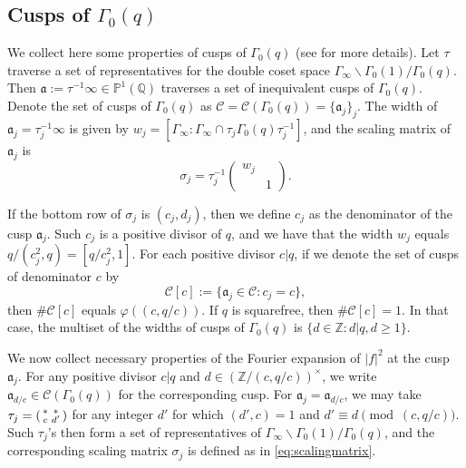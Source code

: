 \documentclass[12pt,reqno]{amsart}
\theoremstyle{remark}
\newcommand{\bs}{\backslash}
\numberwithin{equation}{section}
\begin{document}
	
	\subsection{Cusps of \texorpdfstring{$\Gamma_0(q)$}{G} }\label{subsec:cusps}
	We collect here some properties of cusps of $\Gamma_0(q)$ (see \cite[Section 3.4]{NPS} for more details). Let $\tau$ traverse a set of representatives for the double coset space $\Gamma_{\infty}\bs\Gamma_0(1)/\Gamma_0(q)$. Then $\mathfrak{a}:= \tau^{-1} \infty \in \mathbb{P}^1(\mathbb{Q})$ traverses a set of inequivalent cusps of $\Gamma_0(q)$. Denote the set of cusps of $\Gamma_0(q)$ as $\mathcal{C} = \mathcal{C}(\Gamma_0(q))=\{\mathfrak{a}_j\}_j$. The width of $\mathfrak{a}_j = \tau_j^{-1} \infty$ is given by $w_j = [\Gamma_\infty: \Gamma_\infty \cap \tau_j\Gamma_0(q)\tau_j^{-1}]$, and the scaling matrix of $\mathfrak{a}_j$ is 
\begin{equation}\label{eq:scalingmatrix}
		\sigma_j = \tau_j^{-1} \begin{pmatrix}w_j& \\&1\end{pmatrix}.
	\end{equation}
 
	If the bottom row of $\sigma_j$ is $(c_j, d_j)$, then we  define $c_j$ as the denominator of the cusp $\mathfrak{a}_j$.  Such $c_j$ is a positive divisor of $q$, and we have that the width $w_j$ equals $q/(c_j^2,q)= [q/c_j^2, 1]$. For each positive divisor $c|q$, if we denote the set of cusps of denominator $c$ by 
	\begin{equation}\label{def:C[c]}
	    \mathcal{C}[c] := \{\mathfrak{a}_j \in \mathcal{C}: c_j = c\},
	\end{equation}
    then $\#\mathcal{C}[c]$ equals $\varphi((c,q/c))$. If $q$ is squarefree, then $\#\mathcal{C}[c]=1$. In that case, the multiset of the widths of cusps of $\Gamma_0(q)$ is $\{d \in \mathbb{Z}: d|q, d \ge 1\}$. 
    
    
    
    
    We now collect necessary properties of the Fourier expansion of $|f|^2$ at the cusp $\mathfrak{a}_j$. For any positive divisor $c|q$ and $d \in (\mathbb{Z}/(c,q/c))^{\times}$, we write $\mathfrak{a}_{d/c} \in \mathcal{C}(\Gamma_0(q))$ for the corresponding cusp. For $\mathfrak{a}_j = \mathfrak{a}_{d/c}$, we may take $\tau_j = \begin{psmallmatrix} * & *\\c & d'\end{psmallmatrix}$ for any integer $d'$ for which $(d', c) = 1$ and $d' \equiv d \pmod{(c, q/c)}$. Such $\tau_j$'s then form a set of representatives of $\Gamma_{\infty}\bs\Gamma_0(1)/\Gamma_0(q)$, and the corresponding scaling matrix $\sigma_j$ is defined as in \eqref{eq:scalingmatrix}.
    
\end{document}
